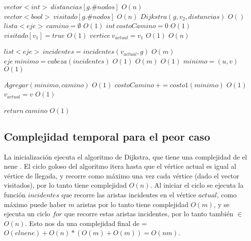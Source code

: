 \begin{algorithmic}


\State $vector<int> \: distancias[g.\#nodos]$
\Comment $ O(n) $
\State $vector<bool> \: visitado[g.\#nodos]$
\Comment $ O(n) $
\State $ Dijkstra( g, v_2, distancias) $
\Comment $ O() $
\State $lista<eje> \: camino= \emptyset$
\Comment $ O(1) $
\State $ int \: costoCamino = 0 $
\Comment $ O(1) $
\State $ visitado[v_1] = true $
\Comment $ O(1) $
\State $ vertice \: v_{actual} = v_1 $
\Comment $ O(1) $
\Comment $ O(n) $

	\State $ list<eje> \: incidentes = incidentes(v_{actual}, g) $
	\Comment $ O(m) $
	\State $ eje \:	 minimo = cabeza(incidentes) $
	\Comment $ O(1) $
	\Comment $ O(m) $
		\Comment $ O(1) $
			\State $ minimo = (u,v) $
			\Comment $ O(1) $
		\EndIf
	\EndFor

	\State $ Agregar(minimo, camino) $
	\Comment $ O(1) $
	\State $ costoCamino \: += costo1(minimo) $
	\Comment $ O(1) $
	\State $ v_{actual} = v $
	\Comment $ O(1) $

\EndWhile

\State $ return \: camino $
\Comment $ O(1) $

\EndProcedure

\end{algorithmic}



\subsection{Complejidad temporal para el peor caso}

La inicializaci\'on ejecuta el algoritmo de Dijkstra, que tiene una complejidad de el nene . El ciclo goloso del algoritmo itera hasta que el v\'ertice actual es igual al v\'ertice de llegada, y recorre como m\'aximo una vez cada v\'ertice (dado el vector visitados), por lo tanto tiene complejidad $O(n)$. Al iniciar el ciclo se ejecuta la funci\'on $incidentes$ que recorre las aristas incidentes en el v\'ertice $actual$, como m\'aximo puede haber $m$ aristas por lo tanto tiene complejidad $O(m)$, y se ejecuta un ciclo $for$ que recorre estas aristas incidentes, por lo tanto tambi\'en $\in$ $O(n)$. Esto nos da una complejidad final de = $ O(el nene) + O(n)*(O(m)+O(m)) = O(nm)$. 

